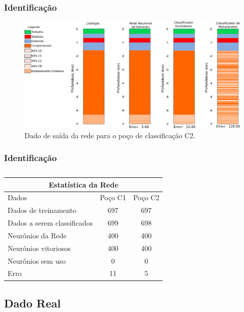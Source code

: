 \documentclass[aspectratio=10]{beamer} %
\begin{document}
\begin{frame}
\frametitle{Identificação}
\begin{figure}[H]
\centering
\includegraphics[scale=0.3]{Imagens/IDC2020118.png}
\caption{Dado de saída da rede para o poço de classificação C2.}
\label{Class C2}
\end{figure} 
\end{frame}

\begin{frame}
	\frametitle{Identificação}
\begin{table}[H]
	\centering
	\caption{}
	\label{Estatistica da rede}
	\begin{tabular}{@{}lcc@{}}
		\toprule
		\multicolumn{3}{c}{Estatística da Rede}         \\ \midrule
		Dados                       & Poço C1 & Poço C2 \\
		Dados de treinamento        & 697     & 697     \\
		Dados a serem classificados & 699     & 698     \\
		Neurônios da Rede           & 400     & 400     \\
		Neurônios vitoriosos        & 400     & 400     \\
		Neurônios sem uso           & 0       & 0       \\
		Erro                        & 11      & 5       \\ \bottomrule
	\end{tabular}
\end{table} 
\end{frame}

\subsection{Dado Real}
\end{document}
